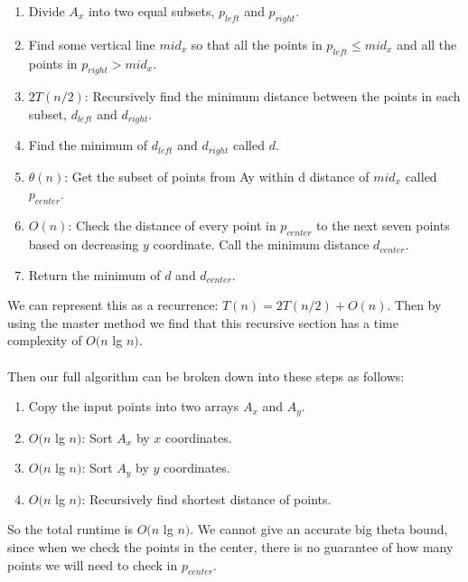\documentclass[12pt]{report}
\begin{document}
\begin{enumerate}
\item Divide $A_x$ into two equal subsets, $p_{left}$ and $p_{right}$.
\item Find some vertical line $mid_x$ so that all the points in $p_{left} \leq mid_x$ and all the points in $p_{right} > mid_x$.
\item $2T(n/2)$: Recursively find the minimum distance between the points in each subset, $d_{left}$ and $d_{right}$.
\item Find the minimum of $d_{left}$ and $d_{right}$ called $d$.
\item $\theta{(n)}$: Get the subset of points from Ay within d distance of $mid_x$ called $p_{center}$.
\item $O(n)$: Check the distance of every point in $p_{center}$ to the next seven points based on decreasing $y$ coordinate. Call the minimum distance $d_{center}$.
\item Return the minimum of $d$ and $d_{center}$.
\end{enumerate}
We can represent this as a recurrence: $T(n) = 2T(n/2) + O(n)$. Then by using the master method we find that this recursive section has a time complexity of $O(n$ lg $n)$.
\\\\
Then our full algorithm can be broken down into these steps as follows:
\begin{enumerate}
\item Copy the input points into two arrays $A_x$ and $A_y$.
\item $O(n$ lg $n)$: Sort $A_x$ by $x$ coordinates.
\item $O(n$ lg $n)$: Sort $A_y$ by $y$ coordinates.
\item $O(n$ lg $n)$: Recursively find shortest distance of points.
\end{enumerate}
So the total runtime is $O(n$ lg $n)$. We cannot give an accurate big theta bound, since when we check the points in the center, there is no guarantee of how many points we will need to check in $p_{center}$.
\end{document}
